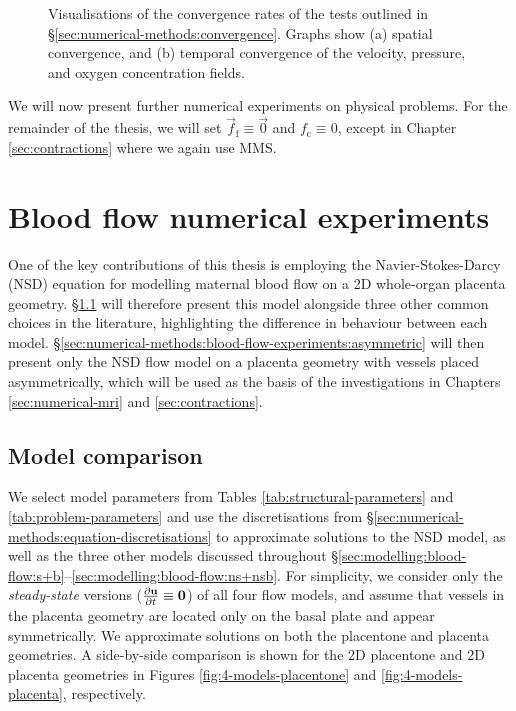 \begin{figure}
\begin{subfigure}{0.45\textwidth}
                \caption{}
                \label{fig:mms-convergence:time}
            \end{subfigure}
            \caption{Visualisations of the convergence rates of the tests outlined in \S\ref{sec:numerical-methods:convergence}. Graphs show (a) spatial convergence, and (b) temporal convergence of the velocity, pressure, and oxygen concentration fields.}
            \label{fig:mms-convergence}
        \end{figure}

        We will now present further numerical experiments on physical problems. For the remainder of the thesis, we will set $\vec{f}_\text{f} \equiv \vec{0}$ and $f_\text{c} \equiv 0$, except in Chapter \ref{sec:contractions} where we again use MMS.
    
    \section{Blood flow numerical experiments} \label{sec:numerical-methods:blood-flow-experiments}    
        One of the key contributions of this thesis is employing the Navier-Stokes-Darcy (NSD) equation for modelling maternal blood flow on a 2D whole-organ placenta geometry. \S\ref{sec:numerical-methods:blood-flow-experiments:comparison} will therefore present this model alongside three other common choices in the literature, highlighting the difference in behaviour between each model. \S\ref{sec:numerical-methods:blood-flow-experiments:asymmetric} will then present only the NSD flow model on a placenta geometry with vessels placed asymmetrically, which will be used as the basis of the investigations in Chapters \ref{sec:numerical-mri} and \ref{sec:contractions}.

        \subsection{Model comparison} \label{sec:numerical-methods:blood-flow-experiments:comparison}
        
            We select model parameters from Tables \ref{tab:structural-parameters} and \ref{tab:problem-parameters} and use the discretisations from \S\ref{sec:numerical-methods:equation-discretisations} to approximate solutions to the NSD model, as well as the three other models discussed throughout \S\ref{sec:modelling:blood-flow:s+b}--\ref{sec:modelling:blood-flow:ns+nsb}. For simplicity, we consider only the \textit{steady-state} versions ($\pdv{\boldsymbol{\mathbf{u}}}{t} \equiv \boldsymbol{\mathbf{0}}$) of all four flow models, and assume that vessels in the placenta geometry are located only on the basal plate and appear symmetrically. We approximate solutions on both the placentone and placenta geometries. A side-by-side comparison is shown for the 2D placentone and 2D placenta geometries in Figures \ref{fig:4-models-placentone} and \ref{fig:4-models-placenta}, respectively.

